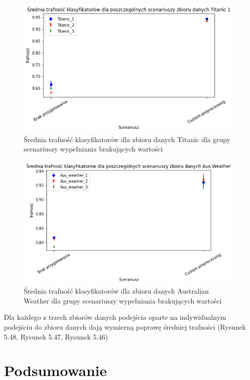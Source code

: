 \documentclass{book}
\begin{document}
\begin{figure}[H]
    \centerline{\includegraphics[scale=0.5]{Titanic_Avg_Custom}}
    \centering
    \caption{Średnia trafność klasyfikatorów dla zbioru danych Titanic 
    dla grupy scenariuszy wypełniania brakujących wartości}
    \end{figure}

\begin{figure}[H]
    \centerline{\includegraphics[scale=0.5]{Aus_Weather_Avg_Custom}}
    \centering
    \caption{Średnia trafność klasyfikatorów dla zbioru danych Australian Weather 
    dla grupy scenariuszy wypełniania brakujących wartości}
    \end{figure}

    Dla każdego z trzech zbiorów danych podejścia 
    oparte na indywidualnym podejściu do zbioru 
    danych dają wymierną poprawę średniej trafności 
    (Rysunek 5.48, Rysunek 5.47, Rysunek 5.46)


\chapter{Podsumowanie}
\end{document}
